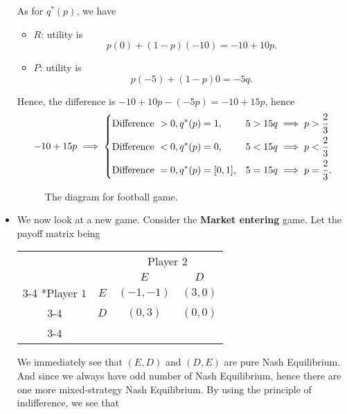 \begin{itemize}
	      As for \(q^{\ast}(p)\), we have
	      \begin{itemize}
		      \item \(R\): utility is
		            \[
			            p(0)+(1 - p)(-10)= -10 + 10p.
		            \]
		      \item \(P\): utility is
		            \[
			            p(-5)+(1 - p)0 = -5q.
		            \]
	      \end{itemize}
	      Hence, the difference is \(-10 + 10p - (-5p) = -10 + 15p\), hence
	      \[
		      -10 +15p\implies \begin{dcases}
			      \text{Difference }> 0, q^{\ast}(p) = 1,     & 5>15q \implies p>\frac{2}{3}  \\
			      \text{Difference }< 0, q^{\ast}(p) = 0,     & 5<15q \implies p<\frac{2}{3}  \\
			      \text{Difference }= 0, q^{\ast}(p) = [0,1], & 5=15q \implies p=\frac{2}{3}.
		      \end{dcases}
	      \]
	      \begin{figure}[H]
		      \centering
		      \caption{The diagram for football game.}
		      \label{fig:NE-football}
	      \end{figure}
	\item We now look at a new game. Consider the \textbf{Market entering} game. Let the payoff matrix being
	      \begin{table}[H]
		      \centering
		      \setlength{\extrarowheight}{2pt}
		      \begin{tabular}{cc|c|c|}
			                                & \multicolumn{1}{c}{} & \multicolumn{2}{c}{Player $2$}                           \\
			                                & \multicolumn{1}{c}{} & \multicolumn{1}{c}{$E$}        & \multicolumn{1}{c}{$D$} \\\cline{3-4}
			      \multirow{2}*{Player $1$} & $E$                  & $(-1, -1)$                     & $(3, 0)$                \\\cline{3-4}
			                                & $D$                  & $(0, 3)$                       & $(0, 0)$                \\\cline{3-4}
		      \end{tabular}
	      \end{table}
	      We immediately see that \((E, D)\) and \((D, E)\) are pure Nash Equilibrium. And since we always have odd number of Nash Equilibrium,
	      hence there are one more mixed-strategy Nash Equilibrium. By using the principle of indifference, we see that

\end{itemize}
